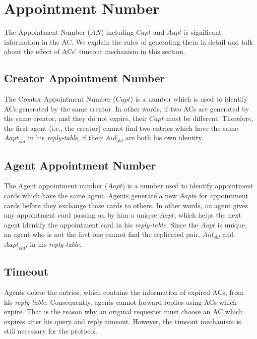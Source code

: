 \section{Appointment Number}

\noindent The Appointment Number ($AN$) including $Capt$ and $Aapt$ is significant information in the AC. We explain the rules of generating them in detail and talk about the effect of ACs' timeout mechanism in this section.


\subsection{Creator Appointment Number}

\noindent The Creator Appointment Number ($Capt$) is a number which is used to identify ACs generated by the same creator. In other words, if two ACs are generated by the same creator, and they do not expire, their $Capt$ must be different. Therefore, the first agent (i.e., the creator) cannot find two entries which have the same ${Aapt}_{old}$ in his \textit{reply-table}, if their ${Aid}_{old}$ are both his own identity.


\subsection{Agent Appointment Number}

\noindent The Agent appointment number ($Aapt$) is a number used to identify appointment cards which have the same agent. Agents generate a new $Aapt$s for appointment cards before they exchange those cards to others. In other words, an agent gives any appointment card passing on by him a unique $Aapt$, which helps the next agent identify the appointment card in his \textit{reply-table}. Since the $Aapt$ is unique, an agent who is not the first one cannot find the replicated pair, ${Aid}_{old}$ and ${Aapt}_{old}$, in his \textit{reply-table}.


\subsection{Timeout}

\noindent Agents delete the entries, which contains the information of expired ACs, from his \textit{reply-table}. Consequently, agents cannot forward replies using ACs which expire. That is the reason why an original requester must choose an AC which expires after his query and reply timeout. However, the timeout mechanism is still necessary for the protocol.

